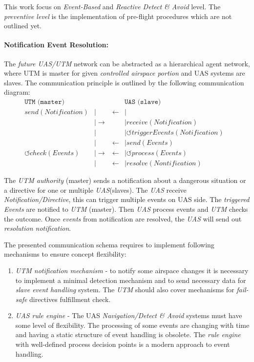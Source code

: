 This work focus on \emph{Event-Based} and \emph{Reactive Detect \& Avoid} level. The \emph{preventive level} is the implementation of pre-flight procedures which are not outlined yet.

\paragraph{Notification Event Resolution:} The \emph{future UAS/UTM} network can be abstracted as a hierarchical agent network, where UTM is master for given \emph{controlled airspace portion} and UAS systems are slaves. The communication principle is outlined by the following communication diagram:
\begin{equation*}
    \begin{aligned}
         \texttt{UTM (master)} & & &  \texttt{UAS (slave)}& \\
         send(Notification) & | &\longleftarrow& | &\\
         &| \longrightarrow  & & | receive(Notification)&\\
         &|& & |\circlearrowleft triggerEvents(Notification)&\\
         &|& \longleftarrow & |send(Events)&\\
         \circlearrowleft check(Events)&|\longrightarrow  & \longleftarrow &| \circlearrowleft  process(Events)&\\
         &|&\longleftarrow&|resolve(Nontification)&
    \end{aligned}
\end{equation*}

\noindent The \emph{UTM authority} (master) sends a notification about a dangerous situation or a directive for one or multiple \emph{UAS}(slaves). The \emph{UAS} receive \emph{Notification/Directive}, this can trigger multiple events on UAS side. The \emph{triggered Events} are notified to \emph{UTM} (master). Then \emph{UAS} process events and \emph{UTM} checks the outcome. Once \emph{events} from notification are resolved, the \emph{UAS} will send out \emph{resolution notification}. 

The presented communication schema requires to implement following mechanisms to ensure concept flexibility:
\begin{enumerate}
    \item \emph{UTM notification mechanism} - to notify some airspace changes it is necessary to implement a minimal detection mechanism and to send necessary data for \emph{slave event handling} system. The \emph{UTM} should also cover mechanisms for \emph{fail-safe} directives fulfillment check.
    
    \item \emph{UAS rule engine} - The UAS \emph{Navigation/Detect \& Avoid} systems must have some level of flexibility. The processing of some events are changing with time and having a static structure of event handling is obsolete. The \emph{rule engine} with well-defined process decision points is a modern approach to event handling.
\end{enumerate}

